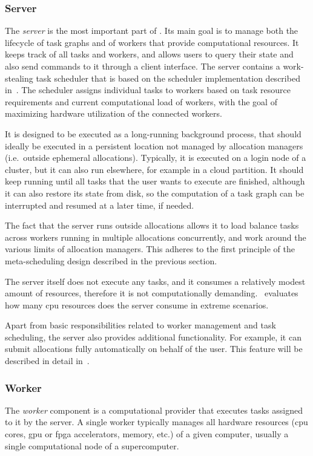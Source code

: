 \subsubsection*{Server}
The \emph{server} is the most important part of \hyperqueue{}. Its main goal is
to manage both the lifecycle of task graphs and of workers that provide computational resources. It
keeps track of all tasks and workers, and allows users to query their state and also send commands
to it through a client interface. The server contains a work-stealing task scheduler that is based
on the \rsds{} scheduler implementation described in~. The
scheduler assigns individual tasks to workers based on task resource requirements and current
computational load of workers, with the goal of maximizing hardware utilization of the connected
workers.

It is designed to be executed as a long-running background process, that should ideally be executed
in a persistent location not managed by allocation managers (i.e.\ outside ephemeral allocations).
Typically, it is executed on a login node of a cluster, but it can also run elsewhere, for example
in a cloud partition. It should keep running until all tasks that the user wants to execute are
finished, although it can also restore its state from disk, so the computation of a task graph can
be interrupted and resumed at a later time, if needed.

The fact that the server runs outside allocations allows it to load balance tasks across workers
running in multiple allocations concurrently, and work around the various limits of allocation
managers. This adheres to the first principle of the meta-scheduling design described in the
previous section.

The server itself does not execute any tasks, and it consumes a relatively modest amount of
resources, therefore it is not computationally demanding.~ evaluates how
many \gls{cpu} resources does the server consume in extreme scenarios.

Apart from basic responsibilities related to worker management and task scheduling, the server also
provides additional functionality. For example, it can submit allocations fully automatically on
behalf of the user. This feature will be described in detail in~.

\subsubsection*{Worker}
The \emph{worker} component is a computational provider that executes tasks assigned to
it by the server. A single worker typically manages all hardware resources (\gls{cpu}
cores, \gls{gpu} or \gls{fpga} accelerators, memory, etc.) of a given
computer, usually a single computational node of a supercomputer.

